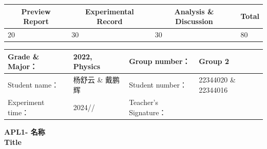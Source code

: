 


\begin{table}
	\renewcommand\arraystretch{1.7}
	\begin{tabularx}{\textwidth}{
			|X|X|X|X
			|X|X|X|X|}
		\hline
		\multicolumn{2}{|c|}{Preview Report}&\multicolumn{2}{|c|}{Experimental Record}&\multicolumn{2}{|c|}{Analysis \& Discussion}&\multicolumn{2}{|c|}{\Large\textbf{Total}}\\
		\hline
		\LARGE20 & & \LARGE30 & & \LARGE30 & & \LARGE80 & \\
		\hline
	\end{tabularx}
\end{table}


\begin{table}
	\renewcommand\arraystretch{1.7}
	\begin{tabularx}{\textwidth}{|X|X|X|X|}
		\hline
		Grade \& Major： & 2022, Physics &Group number： & Group 2\\
		\hline
		Student name： & 杨舒云 \& 戴鹏辉  & Student number： & 22344020 \& 22344016\\
		\hline
		Experiment time： & 2024// & Teacher's Signature： & \\
		\hline
	\end{tabularx}
\end{table}


\begin{center}
	\huge \textbf{APL1- \quad 名称\\Title}
\end{center}



